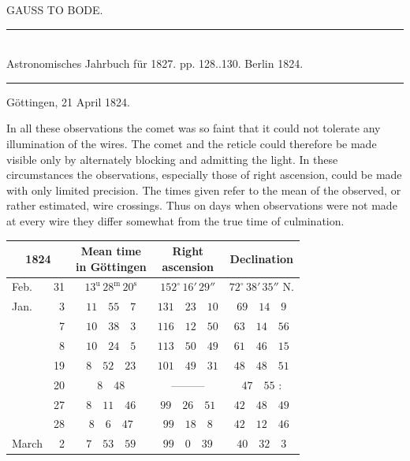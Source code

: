\clearpage
{}

\begin{center}
{\large GAUSS TO BODE.}
\end{center}

\begin{center}
\rule{6cm}{0.4pt}\\
Astronomisches Jahrbuch für 1827. pp. 128..130. Berlin 1824.\\
\rule{6cm}{0.4pt}
\end{center}

\begin{flushright}
Göttingen, 21 April 1824.
\end{flushright}

In all these observations the comet was so faint that it could not tolerate any illumination of the wires. The comet and the reticle could therefore be made visible only by alternately blocking and admitting the light. In these circumstances the observations, especially those of right ascension, could be made with only limited precision. The times given refer to the mean of the observed, or rather estimated, wire crossings. Thus on days when observations were not made at every wire they differ somewhat from the true time of culmination.

\begin{center}
\begingroup\small\setlength{\tabcolsep}{4pt}
\begin{tabular}{lr|c|c|c}
\multicolumn{2}{c|}{1824} & \shortstack{Mean time\\in Göttingen} & \shortstack{Right\\ascension} & Declination \\
\hline
Feb. & 31 & $13^{\mathrm u}\,28^{\mathrm m}\,20^{\mathrm s}$ & $152^\circ\,16'\,29''$ & $72^\circ\,38'\,35''$ N. \\
Jan. & 3 & $11\quad55\quad7$ & $131\quad23\quad10$ & $69\quad14\quad9$ \\
 & 7 & $10\quad38\quad3$ & $116\quad12\quad50$ & $63\quad14\quad56$ \\
 & 8 & $10\quad24\quad5$ & $113\quad50\quad49$ & $61\quad46\quad15$ \\
 & 19 & $8\quad52\quad23$ & $101\quad49\quad31$ & $48\quad48\quad51$ \\
 & 20 & $8\quad48$ & ---\quad---\quad--- & $47\quad55$ \quad : \\
 & 27 & $8\quad11\quad46$ & $99\quad26\quad51$ & $42\quad48\quad49$ \\
 & 28 & $8\quad6\quad47$ & $99\quad18\quad8$ & $42\quad12\quad46$ \\
March & 2 & $7\quad53\quad59$ & $99\quad0\quad39$ & $40\quad32\quad3$ \\
\end{tabular}
\endgroup
\end{center}

